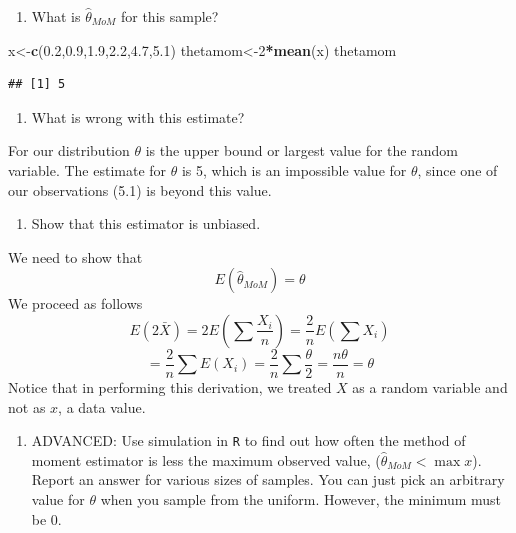 \documentclass[
]{book}
\newenvironment{Shaded}{\begin{snugshade}}{\end{snugshade}}
\newcommand{\DecValTok}[1]{\textcolor[rgb]{0.00,0.00,0.81}{#1}}
\newcommand{\FloatTok}[1]{\textcolor[rgb]{0.00,0.00,0.81}{#1}}
\newcommand{\KeywordTok}[1]{\textcolor[rgb]{0.13,0.29,0.53}{\textbf{#1}}}
\newcommand{\NormalTok}[1]{#1}
\newcommand{\OperatorTok}[1]{\textcolor[rgb]{0.81,0.36,0.00}{\textbf{#1}}}
\providecommand{\tightlist}{%
  \setlength{\itemsep}{0pt}\setlength{\parskip}{0pt}}
\begin{document}
\begin{enumerate}
\def\labelenumi{\alph{enumi})}
\tightlist
\item
  What is \(\hat{\theta}_{MoM}\) for this sample?
\end{enumerate}

\begin{Shaded}
\begin{Highlighting}[]
\NormalTok{x<-}\KeywordTok{c}\NormalTok{(}\FloatTok{0.2}\NormalTok{,}\FloatTok{0.9}\NormalTok{,}\FloatTok{1.9}\NormalTok{,}\FloatTok{2.2}\NormalTok{,}\FloatTok{4.7}\NormalTok{,}\FloatTok{5.1}\NormalTok{)}
\NormalTok{thetamom<-}\DecValTok{2}\OperatorTok{*}\KeywordTok{mean}\NormalTok{(x)}
\NormalTok{thetamom}
\end{Highlighting}
\end{Shaded}

\begin{verbatim}
## [1] 5
\end{verbatim}

\begin{enumerate}
\def\labelenumi{\alph{enumi})}
\setcounter{enumi}{1}
\tightlist
\item
  What is wrong with this estimate?
\end{enumerate}

For our distribution \(\theta\) is the upper bound or largest value for the random variable. The estimate for \(\theta\) is 5, which is an impossible value for \(\theta\), since one of our observations (5.1) is beyond this value.

\begin{enumerate}
\def\labelenumi{\alph{enumi})}
\setcounter{enumi}{2}
\tightlist
\item
  Show that this estimator is unbiased.
\end{enumerate}

We need to show that
\[
E\left( \hat{\theta}_{MoM} \right) = \theta
\]
We proceed as follows
\[
E \left(2\bar{X} \right) = 2 E\left( \sum{\frac{X_i}{n}} \right) = \frac{2}{n} E\left( \sum{X_i} \right)
\]
\[
=\frac{2}{n}  \sum{E\left(X_i \right)} =\frac{2}{n}\sum{\frac{\theta}{2}}=\frac{n\theta}{n}=\theta
\]
Notice that in performing this derivation, we treated \(X\) as a random variable and not as \(x\), a data value.

\pagebreak

\begin{enumerate}
\def\labelenumi{\alph{enumi})}
\setcounter{enumi}{3}
\tightlist
\item
  ADVANCED: Use simulation in \texttt{R} to find out how often the method of moment estimator is less the maximum observed value, (\(\hat{\theta}_{MoM} < \max x\)). Report an answer for various sizes of samples. You can just pick an arbitrary value for \(\theta\) when you sample from the uniform. However, the minimum must be 0.
\end{enumerate}
\end{document}
